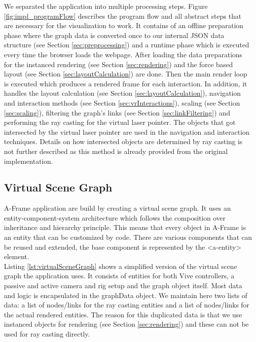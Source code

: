 We separated the application into multiple processing steps. Figure \ref{fig:impl_programFlow} describes the program flow and all abstract steps that are necessary for the visualization to work.
It contains of an offline preparation phase where the graph data is converted once to our internal JSON data structure (see Section \ref{sec:preprocessing}) and a runtime phase which is executed every time the browser loads the webpage.
After loading the data preparations for the instanced rendering (see Section \ref{sec:rendering}) and the force based layout (see Section \ref{sec:layoutCalculation}) are done.
Then the main render loop is executed which produces a rendered frame for each interaction. In addition, it handles the layout calculation (see Section \ref{sec:layoutCalculation}), navigation and interaction methods (see Section \ref{sec:vrInteractions}), scaling (see Section \ref{sec:scaling}), filtering the graph's links (see Section \ref{sec:linkFiltering}) and performing the ray casting for the virtual laser pointer.
The objects that got intersected by the virtual laser pointer are used in the navigation and interaction techniques. 
Details on how intersected objects are determined by ray casting is not further described as this method is already provided from the original implementation. 

\subsection{Virtual Scene Graph}
A-Frame application are build by creating a virtual scene graph.
It uses an entity-component-system architecture which follows the  composition over inheritance and hierarchy principle. 
This means that every object in A-Frame is an entity that can be customized by code.
There are various components that can be reused and extended, the base component is represented by the <a-entity> element.\\
Listing \ref{lst:virtualSceneGraph} shows a simplified version of the virtual scene graph the application uses. 
It consists of entities for both Vive controllers, a passive and active camera and rig setup and the graph object itself.
Most data and logic is encapsulated in the graphData object. We maintain here two lists of data: a list of nodes/links for the ray casting entities and a list of nodes/links for the actual rendered entities. 
The reason for this duplicated data is that we use  instanced objects for rendering (see Section \ref{sec:rendering}) and these can not be used for ray casting directly.

